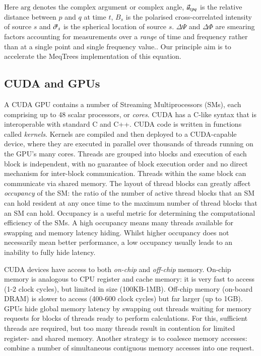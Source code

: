 \documentclass[11pt,twoside]{article}
\begin{document}
Here $\mbox{arg}$ denotes the complex argument or complex angle,
$\vec{u}_{tpq}$ is the relative distance between $p$ and $q$ at time $t$,
$B_s$ is the polarised cross-correlated intensity of source $s$ and
$\vec{\sigma}_s$ is the spherical location of source $s$. $\Delta\Psi$ and
$\Delta\Phi$ are smearing factors accounting for measurements over a
\emph{range} of time and frequency rather than at a single point and single
frequency value.\citep{Smirnov2011, Taylor1999}. Our principle
aim is to accelerate the MeqTrees implementation of this equation.



\subsection{CUDA and GPUs}

A CUDA GPU contains a number of Streaming Multiprocessors (SMs), each
comprising up to 48 scalar processors, or \emph{cores}.   CUDA has a C-like
syntax that is interoperable with standard C and C++. CUDA code is written in
functions called \emph{kernels}.  Kernels are compiled and then deployed to a
CUDA-capable device, where they are executed in parallel over thousands of
threads running on the GPU's many cores.   Threads are grouped into blocks and
execution of each block is independent, with no guarantee of block execution
order and no direct mechanism for inter-block communication. Threads within
the same block can communicate via shared memory.  The layout of thread blocks
can greatly affect \emph{occupancy} of the SM: the ratio of the number of
active thread blocks that an SM can hold resident at any once time to the
maximum number of thread blocks that an SM can hold. Occupancy is a useful
metric for determining the computational efficiency of the SMs. A high
occupancy means many threads available  for swapping and memory latency
hiding. Whilst higher occupancy does not necessarily mean better performance,
a low occupancy usually leads to an inability to fully hide latency.

CUDA devices have access to both \emph{on-chip} and \emph{off-chip} memory.
On-chip memory is analogous to CPU register and cache memory: it is very fast
to access (1-2 clock cycles), but limited in size (100KB-1MB). Off-chip memory
(on-board DRAM) is slower to access (400-600 clock cycles) but far larger (up
to 1GB). GPUs hide global memory latency by swapping out threads
waiting for memory requests for blocks of threads ready to perform
calculations. For this, sufficient threads are required, but too
many threads result in contention for limited register- and shared memory.
Another strategy is to coalesce memory accesses:  combine a number of
simultaneous contiguous memory accesses into one request.
\end{document}
